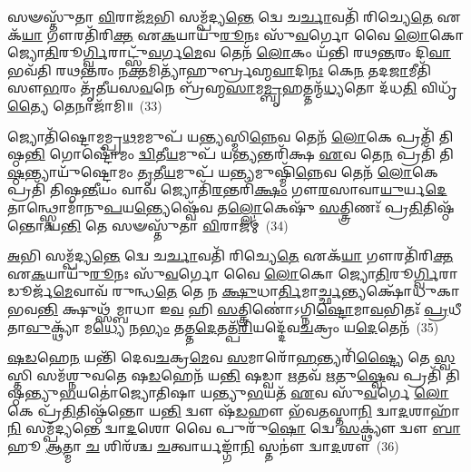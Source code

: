 𑌸𑍟𑌸𑍍𑌤𑍁᳴𑌤𑌾 \ul{𑌵𑌿}\-𑌰𑌾𑌜᳴\-\ul{𑌮}\-𑌭𑌿 𑌸𑌮𑍍𑌪᳴𑌦𑍍𑌯\-\ul{𑌨𑍍𑌤𑍇} 𑌦𑍍𑌵𑍇 𑌚\-\ul{𑌰𑍍𑌚𑌾}\-𑌵𑌤𑌿᳴ 𑌰𑌿𑌚𑍍𑌯𑍇\-\ul{𑌤𑍇} 𑌏𑌕᳴\-\ul{𑌯𑌾} 𑌗𑍗𑌰𑌤𑌿᳴𑌰𑌿\-\ul{𑌕𑍍𑌤} 𑌏\-\ul{𑌕}\-𑌯𑌾𑌯𑍁᳴\-\ul{𑌰𑍂}\-𑌨𑌃 𑌸𑍁᳴\-\ul{𑌵}\-𑌰𑍍𑌗𑍋 𑌵𑍈 \ul{𑌲𑍋}\-𑌕𑍋 𑌜𑍍𑌯𑍋\-\ul{𑌤𑌿}\-𑌰𑍂\-\ul{𑌰𑍍𑌗𑍍𑌵𑌿}\-𑌰𑌾𑌟𑍍𑌸𑍁᳴\-\ul{𑌵}\-𑌰𑍍𑌗\-\ul{𑌮𑍇}\-𑌵 𑌤𑍇𑌨᳴ \ul{𑌲𑍋}\-𑌕𑌂 𑌯᳴𑌨𑍍𑌤𑌿 𑌰𑌥\-\ul{𑌨𑍍𑌤}\-𑌰𑌂 𑌦𑌿\-\ul{𑌵𑌾} 𑌭𑌵᳴𑌤𑌿 𑌰𑌥\-\ul{𑌨𑍍𑌤}\-𑌰𑌂 𑌨\-\ul{𑌕𑍍𑌤}\-𑌮𑌿𑌤𑍍𑌯𑌾᳴𑌹𑍁𑌰𑍍𑌬𑍍𑌰𑌹𑍍𑌮\-\ul{𑌵𑌾}\-𑌦𑌿\-\ul{𑌨𑌃} 𑌕𑍇\-\ul{𑌨} 𑌤𑌦\-\ul{𑌜𑌾}\-𑌮𑍀𑌤𑌿᳴ 𑌸𑍗\-\ul{𑌭}\-𑌰𑌂 𑌤𑍃᳴𑌤𑍀𑌯𑌸\-\ul{𑌵}\-𑌨𑍇 𑌬𑍍𑌰᳴𑌹𑍍𑌮\-\ul{𑌸𑌾}\-𑌮\-\ul{𑌮𑍍𑌬𑍃}\-𑌹𑌤𑍍𑌤𑌨𑍍𑌮᳴\-\ul{𑌧𑍍𑌯}\-𑌤𑍋 𑌦᳴𑌧\-\ul{𑌤𑌿} 𑌵𑌿𑌧𑍃᳴\-\ul{𑌤𑍍𑌯𑍈} 𑌤𑍇𑌨𑌾𑌜𑌾᳴𑌮𑌿॥~(33)

{\anuvakamend[{𑌤 𑌏\-\ul{𑌕𑌾}\-𑌨𑍍𑌨𑌪᳴\-\ul{𑌞𑍍𑌚𑌾}\-𑌶𑌚𑍍𑌚᳴}]}%

𑌜𑍍𑌯𑍋𑌤𑌿᳴𑌷𑍍𑌟𑍋𑌮𑌮𑍍𑌪𑍍𑌰\-\ul{𑌥}\-𑌮𑌮𑍁𑌪᳴ 𑌯\-\ul{𑌨𑍍𑌤𑍍𑌯}\-𑌸𑍍𑌮𑌿\-\ul{𑌨𑍍𑌨𑍇}\-𑌵 𑌤𑍇𑌨᳴ \ul{𑌲𑍋}\-𑌕𑍇 𑌪𑍍𑌰𑌤𑌿᳴ 𑌤𑌿𑌷𑍍𑌠\-\ul{𑌨𑍍𑌤𑌿} 𑌗𑍋𑌷𑍍𑌟𑍋᳴𑌮𑌂 \ul{𑌦𑍍𑌵𑌿}\-𑌤𑍀\-\ul{𑌯}\-𑌮𑍁𑌪᳴ 𑌯\-\ul{𑌨𑍍𑌤𑍍𑌯}\-𑌨𑍍𑌤𑌰𑌿᳴𑌕𑍍𑌷 \ul{𑌏}\-𑌵 𑌤𑍇\-\ul{𑌨} 𑌪𑍍𑌰𑌤𑌿᳴ 𑌤𑌿\-\ul{𑌷𑍍𑌠}\-𑌨𑍍𑌤𑍍𑌯𑌾𑌯𑍁᳴𑌷𑍍𑌟𑍋𑌮𑌂 \ul{𑌤𑍃}\-𑌤𑍀\-\ul{𑌯}\-𑌮𑍁𑌪᳴ 𑌯\-\ul{𑌨𑍍𑌤𑍍𑌯}\-𑌮𑍁𑌷𑍍𑌮𑌿᳴\-\ul{𑌨𑍍𑌨𑍇}\-𑌵 𑌤𑍇𑌨᳴ \ul{𑌲𑍋}\-𑌕𑍇 𑌪𑍍𑌰𑌤𑌿᳴ 𑌤𑌿𑌷𑍍𑌠\-\ul{𑌨𑍍𑌤𑍀}\-𑌯𑌂 𑌵𑌾𑌵 𑌜𑍍𑌯𑍋𑌤𑌿᳴\-\ul{𑌰}\-𑌨𑍍𑌤𑌰𑌿᳴\-\ul{𑌕𑍍𑌷𑌂} 𑌗𑍗\-\ul{𑌰}\-𑌸𑌾𑌵𑌾\-\ul{𑌯𑍁}\-𑌰𑍍𑌯\-\ul{𑌦𑍇}\-𑌤𑌾𑌨𑍍𑌥𑍍𑌸𑍍𑌤𑍋𑌮𑌾᳴𑌨𑍁\-\ul{𑌪}\-𑌯\-\ul{𑌨𑍍𑌤𑍍𑌯𑍇}\-𑌷𑍍𑌵𑍇᳴𑌵 𑌤\-\ul{𑌲𑍍𑌲𑍋}\-𑌕𑍇𑌷𑍁᳴ \ul{𑌸}\-𑌤𑍍𑌤𑍍𑌰𑌿𑌣𑌃᳴ 𑌪𑍍𑌰\-\ul{𑌤𑌿}\-𑌤𑌿𑌷𑍍𑌠᳴𑌨𑍍𑌤𑍋 𑌯\-\ul{𑌨𑍍𑌤𑌿} 𑌤𑍇 𑌸𑍟𑌸𑍍𑌤𑍁᳴𑌤𑌾 \ul{𑌵𑌿}\-𑌰𑌾𑌜𑌮𑍍॑~(34)

\-\ul{𑌅}\-𑌭𑌿 𑌸𑌮𑍍𑌪᳴𑌦𑍍𑌯\-\ul{𑌨𑍍𑌤𑍇} 𑌦𑍍𑌵𑍇 𑌚\-\ul{𑌰𑍍𑌚𑌾}\-𑌵𑌤𑌿᳴ 𑌰𑌿𑌚𑍍𑌯𑍇\-\ul{𑌤𑍇} 𑌏𑌕᳴\-\ul{𑌯𑌾} 𑌗𑍗𑌰𑌤𑌿᳴𑌰𑌿\-\ul{𑌕𑍍𑌤} 𑌏\-\ul{𑌕}\-𑌯𑌾𑌯𑍁᳴\-\ul{𑌰𑍂}\-𑌨𑌃 𑌸𑍁᳴\-\ul{𑌵}\-𑌰𑍍𑌗𑍋 𑌵𑍈 \ul{𑌲𑍋}\-𑌕𑍋 𑌜𑍍𑌯𑍋\-\ul{𑌤𑌿}\-𑌰𑍂\-\ul{𑌰𑍍𑌗𑍍𑌵𑌿}\-𑌰𑌾𑌡𑍂𑌰𑍍𑌜᳴\-\ul{𑌮𑍇}\-𑌵𑌾𑌵᳴ 𑌰𑍁𑌨𑍍𑌧\-\ul{𑌤𑍇} 𑌤𑍇 𑌨 \ul{𑌕𑍍𑌷𑍁}\-𑌧𑌾\-\ul{𑌰𑍍𑌤𑌿}\-𑌮𑌾\-\ul{𑌰𑍍𑌚𑍍𑌛}\-𑌨𑍍𑌤𑍍𑌯𑌕𑍍𑌷𑍋᳴𑌧𑍁𑌕𑌾 𑌭𑌵\-\ul{𑌨𑍍𑌤𑌿} 𑌕𑍍𑌷𑍁𑌥𑍍𑌸᳴𑌮𑍍𑌬𑌾𑌧𑌾 𑌇\-\ul{𑌵} 𑌹𑌿 \ul{𑌸}\-𑌤𑍍𑌤𑍍𑌰𑌿𑌣𑍋॑\-𑌽𑌗𑍍𑌨𑌿\-\ul{𑌷𑍍𑌟𑍋}\-𑌮𑌾\-\ul{𑌵}\-𑌭𑌿𑌤𑌃᳴ \ul{𑌪𑍍𑌰}\-𑌧𑍀 𑌤𑌾\-\ul{𑌵𑍁}\-𑌕𑍍𑌥𑍍𑌯𑌾᳴ 𑌮\-\ul{𑌧𑍍𑌯𑍇} 𑌨\-\ul{𑌭𑍍𑌯𑌂} 𑌤𑌤𑍍𑌤\-\ul{𑌦𑍇}\-𑌤𑌤𑍍𑌪᳴\-\ul{𑌰𑌿}\-𑌯𑌦𑍍𑌦𑍇᳴𑌵\-\ul{𑌚}\-𑌕𑍍𑌰𑌂 𑌯\-\ul{𑌦𑍇}\-𑌤𑍇𑌨᳴~(35)

\-\ul{𑌷}\-\-\ul{𑌡}\-𑌹𑍇\-\ul{𑌨} 𑌯𑌨𑍍𑌤𑌿᳴ 𑌦𑍇𑌵\-\ul{𑌚}\-𑌕𑍍𑌰\-\ul{𑌮𑍇}\-𑌵 \ul{𑌸}\-𑌮𑌾𑌰𑍋᳴\-\ul{𑌹}\-𑌨𑍍𑌤𑍍𑌯𑌰𑌿᳴\-\ul{𑌷𑍍𑌟𑍍𑌯𑍈} 𑌤𑍇 \ul{𑌸𑍍𑌵}\-𑌸𑍍𑌤𑌿 𑌸𑌮᳴𑌶𑍍𑌨𑍁𑌵𑌤𑍇 𑌷\-\ul{𑌡}\-𑌹𑍇𑌨᳴ 𑌯\-\ul{𑌨𑍍𑌤𑌿} 𑌷𑌡𑍍𑌵𑌾 \ul{𑌋}\-𑌤𑌵᳴ \ul{𑌋}\-𑌤𑍁\-\ul{𑌷𑍍𑌵𑍇}\-𑌵 𑌪𑍍𑌰𑌤𑌿᳴ 𑌤𑌿𑌷𑍍𑌠𑌨𑍍𑌤𑍍𑌯𑍁\-\ul{𑌭}\-𑌯𑌤𑍋॑𑌜𑍍𑌯𑍋𑌤𑌿𑌷𑌾 𑌯𑌨𑍍𑌤𑍍𑌯𑍁\-\ul{𑌭}\-𑌯𑌤᳴ \ul{𑌏}\-𑌵 𑌸𑍁᳴\-\ul{𑌵}\-𑌰𑍍𑌗𑍇 \ul{𑌲𑍋}\-𑌕𑍇 𑌪𑍍𑌰᳴\-\ul{𑌤𑌿}\-𑌤𑌿𑌷𑍍𑌠᳴𑌨𑍍𑌤𑍋 𑌯\-\ul{𑌨𑍍𑌤𑌿} 𑌦𑍍𑌵𑍗 𑌷᳴\-\ul{𑌡}\-𑌹𑍗 𑌭᳴𑌵\-\ul{𑌤}\-𑌸𑍍𑌤𑌾\-\ul{𑌨𑌿} 𑌦𑍍𑌵𑌾\-\ul{𑌦}\-𑌶𑌾𑌹𑌾᳴\-\ul{𑌨𑌿} 𑌸𑌮𑍍𑌪᳴𑌦𑍍𑌯𑌨𑍍𑌤𑍇 𑌦𑍍𑌵𑌾\-\ul{𑌦}\-𑌶𑍋 𑌵𑍈 𑌪𑍁𑌰𑍁᳴\-\ul{𑌷𑍋} 𑌦𑍍𑌵𑍇 \ul{𑌸}\-𑌕𑍍𑌥𑍍𑌯𑍗॑ 𑌦𑍍𑌵𑍗 \ul{𑌬𑌾}\-𑌹𑍂 \ul{𑌆}\-𑌤𑍍𑌮𑌾 \ul{𑌚} 𑌶𑌿𑌰᳴𑌶𑍍𑌚 \ul{𑌚}\-𑌤𑍍𑌵𑌾𑌰𑍍𑌯𑌙𑍍𑌗𑌾᳴\-\ul{𑌨𑌿} 𑌸𑍍𑌤𑌨𑍗॑ 𑌦𑍍𑌵𑌾\-\ul{𑌦}\-𑌶𑍗~(36)

